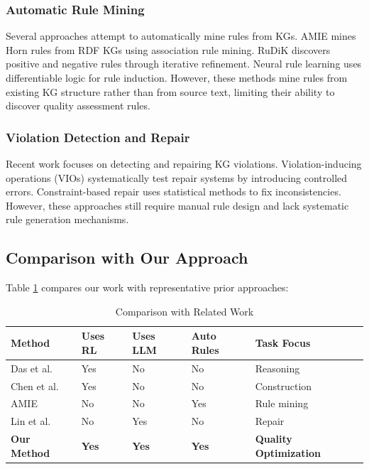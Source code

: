 \documentclass[runningheads]{llncs}
\begin{document}
\subsubsection{Automatic Rule Mining}
Several approaches attempt to automatically mine rules from KGs. AMIE \cite{ref_galarraga2013} mines Horn rules from RDF KGs using association rule mining. RuDiK \cite{ref_ortona2018} discovers positive and negative rules through iterative refinement. Neural rule learning \cite{ref_yang2017} uses differentiable logic for rule induction. However, these methods mine rules from existing KG structure rather than from source text, limiting their ability to discover quality assessment rules.

\subsubsection{Violation Detection and Repair}
Recent work focuses on detecting and repairing KG violations. Violation-inducing operations (VIOs) \cite{ref_lin2025} systematically test repair systems by introducing controlled errors. Constraint-based repair \cite{ref_paulheim2014} uses statistical methods to fix inconsistencies. However, these approaches still require manual rule design and lack systematic rule generation mechanisms.

\subsection{Comparison with Our Approach}

Table \ref{tab:related_comparison} compares our work with representative prior approaches:

\begin{table}[H]
    \centering
    \caption{Comparison with Related Work}
    \label{tab:related_comparison}
    \begin{tabular}{p{3cm} p{2cm} p{2cm} p{2cm} p{2.5cm}}
    \toprule
    \textbf{Method} & \textbf{Uses RL} & \textbf{Uses LLM} & \textbf{Auto Rules} & \textbf{Task Focus} \\
    \midrule
    Das et al. \cite{ref_das2018} & Yes & No & No & Reasoning \\
    Chen et al. \cite{ref_chen2020} & Yes & No & No & Construction \\
    AMIE \cite{ref_galarraga2013} & No & No & Yes & Rule mining \\
    Lin et al. \cite{ref_lin2025} & No & Yes & No & Repair \\
    \textbf{Our Method} & \textbf{Yes} & \textbf{Yes} & \textbf{Yes} & \textbf{Quality Optimization} \\
    \bottomrule
    \end{tabular}
\end{table}
\end{document}
